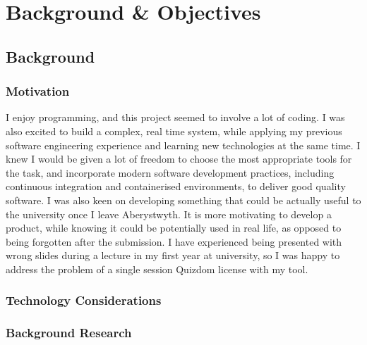 \chapter{Background \& Objectives}


\section{Background}

\subsection{Motivation}
I enjoy programming, and this project seemed to involve a lot of coding. I was also excited
to build a complex, real time system, while applying my previous software engineering
experience and learning new technologies at the same time. I knew I would be given
a lot of freedom to choose the most appropriate tools for the task, and incorporate
modern software development practices, including continuous integration and
containerised environments, to deliver good quality software. I was also keen on developing something that could be actually
useful to the university once I leave Aberystwyth. It is more motivating to develop
a product, while knowing it could be potentially used in real life, as opposed to being
forgotten after the submission. I have experienced being presented with wrong slides
during a lecture in my first year at university, so I was happy to address the problem
of a single session Quizdom license with my tool.

\subsection{Technology Considerations}

\subsection{Background Research}

